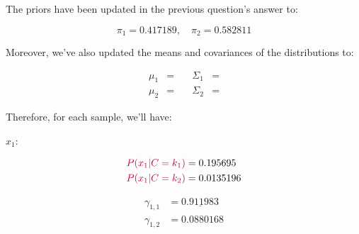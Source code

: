 \documentclass[12pt]{article}
\begin{document}
\begin{enumerate}[leftmargin=\labelsep]
\begin{enumerate}[leftmargin=\labelsep]
                The priors have been updated in the previous question's answer to:

                \begin{equation*}
                  \pi_1 = 0.417189, \quad
                  \pi_2 = 0.582811
                \end{equation*}

                Moreover, we've also updated the means and covariances of the distributions
                to:

                \begin{equation*}
                  \begin{aligned}
                    \mu_1 & =        \quad
                          & \Sigma_1                                             & =  \\
                    \mu_2 & =  \quad
                          & \Sigma_2                                             & = 
                  \end{aligned}
                \end{equation*}

                Therefore, for each sample, we'll have:

                \vspace*{0.5cm}

                \begin{paracol}{3}
                  \setlength{\columnseprule}{1pt}
                  \def\columnseprulecolor{\color{black}}
                  \centering

                  $x_1$:

                  \begin{normalsize}
                    \begin{equation*}
                      \begin{aligned}
                        \textcolor{purple}{P(x_1 | C = k_1)} & = 0.195695  \\
                        \textcolor{purple}{P(x_1 | C = k_2)} & = 0.0135196
                      \end{aligned}
                    \end{equation*}

                    \begin{equation*}
                      \begin{aligned}
                        \gamma_{1, 1} & = \underline{0.911983} \\
                        \gamma_{1, 2} & = 0.0880168
                      \end{aligned}
                    \end{equation*}
                  \end{normalsize}


\end{paracol}
\end{enumerate}
\end{enumerate}
\end{document}
